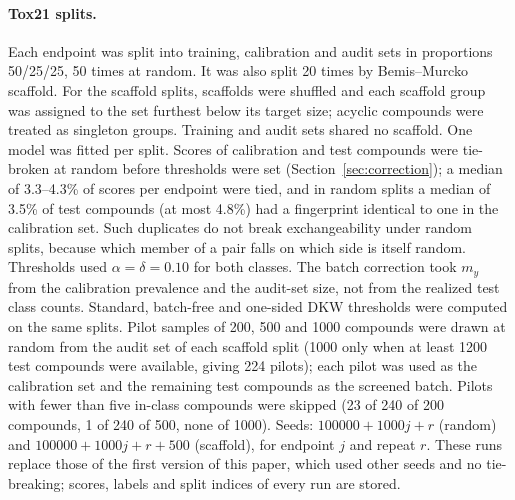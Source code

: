 \documentclass[10pt]{article}
\begin{document}
\paragraph{Tox21 splits.} Each endpoint was split into training, calibration and audit sets in proportions 50/25/25, 50 times at random. It was also split 20 times by Bemis--Murcko scaffold.\citep{Bemis1996Murcko} For the scaffold splits, scaffolds were shuffled and each scaffold group was assigned to the set furthest below its target size; acyclic compounds were treated as singleton groups. Training and audit sets shared no scaffold. One model was fitted per split. Scores of calibration and test compounds were tie-broken at random before thresholds were set (Section~\ref{sec:correction}); a median of 3.3--4.3\% of scores per endpoint were tied, and in random splits a median of 3.5\% of test compounds (at most 4.8\%) had a fingerprint identical to one in the calibration set. Such duplicates do not break exchangeability under random splits, because which member of a pair falls on which side is itself random. Thresholds used $\alpha=\delta=0.10$ for both classes. The batch correction took $m_y$ from the calibration prevalence and the audit-set size, not from the realized test class counts. Standard, batch-free and one-sided DKW thresholds were computed on the same splits. Pilot samples of 200, 500 and 1000 compounds were drawn at random from the audit set of each scaffold split (1000 only when at least 1200 test compounds were available, giving 224 pilots); each pilot was used as the calibration set and the remaining test compounds as the screened batch. Pilots with fewer than five in-class compounds were skipped (23 of 240 of 200 compounds, 1 of 240 of 500, none of 1000). Seeds: $100000+1000j+r$ (random) and $100000+1000j+r+500$ (scaffold), for endpoint $j$ and repeat $r$. These runs replace those of the first version of this paper, which used other seeds and no tie-breaking; scores, labels and split indices of every run are stored.
\end{document}
